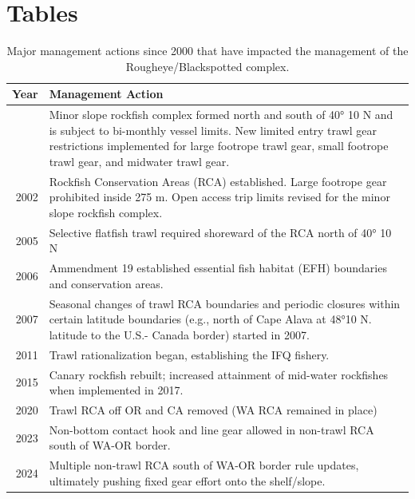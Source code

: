 \documentclass[
]{scrartcl}
\begin{document}
\newpage{}

\section{Tables}\label{tables}

\begingroup
\fontsize{9.0pt}{10.8pt}\selectfont

\begin{longtable}{r>{\raggedright\arraybackslash}p{\dimexpr 300.00pt -2\tabcolsep-1.5\arrayrulewidth}}

\caption{\label{tbl-management_summary}Major management actions since
2000 that have impacted the management of the Rougheye/Blackspotted
complex.}

\tabularnewline

\toprule
Year & Management Action \\ 
\midrule\addlinespace[2.5pt]
2000 & Minor slope rockfish complex formed north and south of 40° 10 N and is subject to bi-monthly vessel limits. New limited entry trawl gear restrictions implemented for large footrope trawl gear, small footrope trawl gear, and midwater trawl gear. \\ 
2002 & Rockfish Conservation Areas (RCA) established. Large footrope gear prohibited inside 275 m. Open access trip limits revised for the minor slope rockfish complex. \\ 
2005 & Selective flatfish trawl required shoreward of the RCA north of 40° 10 N \\ 
2006 & Ammendment 19 established essential fish habitat (EFH) boundaries and conservation areas. \\ 
2007 & Seasonal changes of trawl RCA boundaries and periodic closures within certain latitude boundaries (e.g., north of Cape Alava at 48°10 N. latitude to the U.S.- Canada border) started in 2007. \\ 
2011 & Trawl rationalization began, establishing the IFQ fishery. \\ 
2015 & Canary rockfish rebuilt; increased attainment of mid-water rockfishes when implemented in 2017.  \\ 
2020 & Trawl RCA off OR and CA removed (WA RCA remained in place) \\ 
2023 & Non-bottom contact hook and line gear allowed in non-trawl RCA south of WA-OR border. \\ 
2024 & Multiple non-trawl RCA south of WA-OR border rule updates, ultimately pushing fixed gear effort onto the shelf/slope.  \\ 
\bottomrule

\end{longtable}
\end{document}
